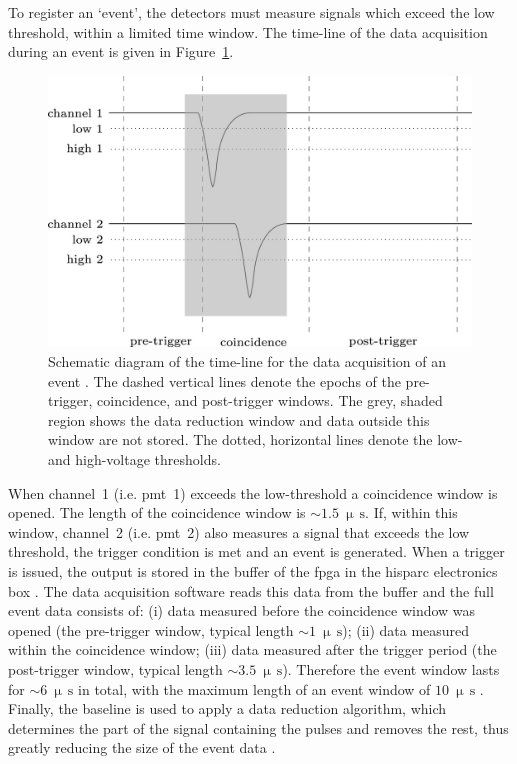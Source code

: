 To register an `event', the detectors must measure signals which exceed the low threshold, within a limited time window. The time-line of the data acquisition during an event is given in Figure~\ref{fig:HS_windows}.

\begin{figure}[ht!]
	\centering
	\includegraphics[width=0.9\columnwidth]{HS_pulses.jpg}
	\caption{Schematic diagram of the time-line for the data acquisition of an event \citep{fokkema_hisparc_2012}. The dashed vertical lines denote the epochs of the pre-trigger, coincidence, and post-trigger windows. The grey, shaded region shows the data reduction window and data outside this window are not stored. The dotted, horizontal lines denote the low- and high-voltage thresholds.}
	\label{fig:HS_windows}
\end{figure}

When channel~1 (i.e. \gls{pmt}~1) exceeds the low-threshold a coincidence window is opened. The length of the coincidence window is $\sim1.5~\upmu\,\mathrm{s}$. If, within this window, channel~2 (i.e. \gls{pmt}~2) also measures a signal that exceeds the low threshold, the trigger condition is met and an event is generated. When a trigger is issued, the output is stored in the buffer of the \gls{fpga} in the \gls{hisparc} electronics box \citep{fokkema_hisparc_2012}. The data acquisition software  reads this data from the buffer and the full event data consists of: (i) data measured before the coincidence window was opened (the pre-trigger window, typical length $\sim1~\upmu\,\mathrm{s}$); (ii) data measured within the coincidence window; (iii) data measured after the trigger period (the post-trigger window, typical length $\sim3.5~\upmu\,\mathrm{s}$). Therefore the event window lasts for $\sim6~\upmu\,\mathrm{s}$ in total, with the maximum length of an event window of $10~\upmu\,\mathrm{s}$ \citep{van_dam_hisparc_2020}. Finally, the baseline is used to apply a data reduction algorithm, which determines the part of the signal containing the pulses and removes the rest, thus greatly reducing the size of the event data \citep{fokkema_hisparc_2012}.

